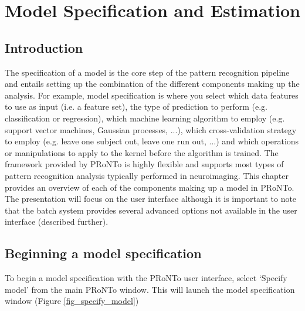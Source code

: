%

\chapter{Model Specification and Estimation}
\label{chap:ModelCrossV}
\minitoc

\section{Introduction}

The specification of a model is the core step of the pattern recognition pipeline and  entails setting up the combination of the different components making up the analysis. For example, model specification is where you select which data features to use as input (i.e. a feature set), the type of prediction to perform (e.g. classification or regression), which machine learning algorithm to employ (e.g. support vector machines, Gaussian processes, ...), which cross-validation strategy to employ (e.g. leave one subject out, leave one run out, ...) and which operations or manipulations to apply to the kernel before the algorithm is trained. The framework provided by PRoNTo is highly flexible and supports most types of pattern recognition analysis typically performed in neuroimaging. This chapter provides an overview of each of the components making up a model in PRoNTo. The presentation will focus on the user interface although it is important to note that the batch system provides several advanced options not available in the user interface (described further).

\section{Beginning a model specification}

To begin a model specification with the PRoNTo user interface, select `Specify model' from the main PRoNTo window. This will launch the model specification window (Figure \ref{fig_specify_model})

